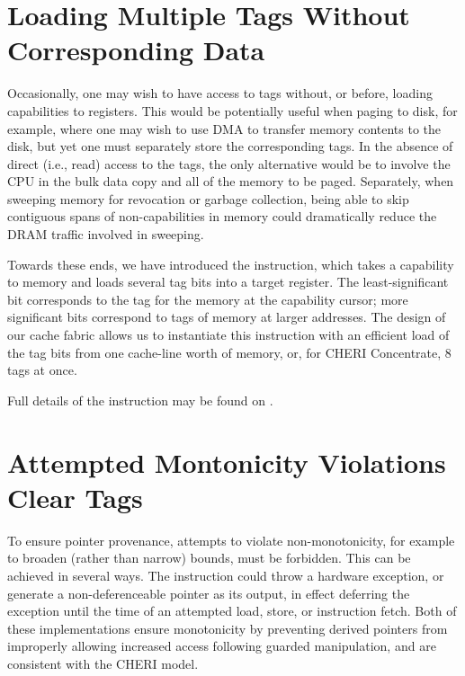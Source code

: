 
\section{Loading Multiple Tags Without Corresponding Data} %
\label{sec:rationale:cloadtags}

Occasionally, one may wish to have access to tags without, or before,
loading capabilities to registers.  This would be potentially useful when
paging to disk, for example, where one may wish to use DMA to transfer
memory contents to the disk, but yet one must separately store the
corresponding tags.  In the absence of direct (i.e., read) access to the
tags, the only alternative would be to involve the CPU in the bulk data copy
and  all of the memory to be paged.  Separately, when
sweeping memory for revocation or garbage collection, being able to skip
contiguous spans of non-capabilities in memory could dramatically reduce the
DRAM traffic involved in sweeping.

Towards these ends, we have introduced the 
instruction, which takes a capability to memory and loads several tag bits
into a target register.  The least-significant bit corresponds to the tag
for the memory at the capability cursor; more significant bits correspond to
tags of memory at larger addresses.  The design of our cache fabric allows
us to instantiate this instruction with an efficient load of the tag bits
from one cache-line worth of memory, or, for CHERI Concentrate, 8 tags at
once.

Full details of the  instruction may be found
on .

\section{Attempted Montonicity Violations Clear Tags}
\label{sec:rationale:tag-clear-vs-exception}

To ensure pointer provenance, attempts to violate non-monotonicity, for example to broaden
(rather than narrow) bounds, must be forbidden. This can be achieved in several ways.
The instruction could throw a hardware exception, or generate a non-deferenceable pointer
as its output, in effect deferring the exception until the time of an attempted load,
store, or instruction fetch.
Both of these implementations ensure monotonicity by preventing derived
pointers from improperly allowing increased access following guarded
manipulation, and are consistent with the CHERI model.

